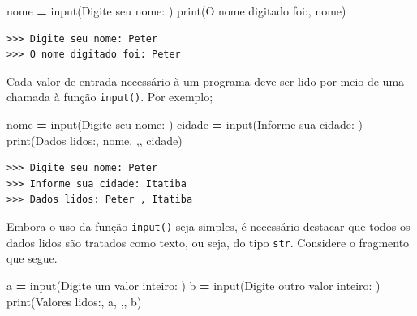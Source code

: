 \documentclass[
]{book}
\newenvironment{Shaded}{\begin{snugshade}}{\end{snugshade}}
\newcommand{\BuiltInTok}[1]{#1}
\newcommand{\NormalTok}[1]{#1}
\newcommand{\OperatorTok}[1]{\textcolor[rgb]{0.81,0.36,0.00}{\textbf{#1}}}
\newcommand{\StringTok}[1]{\textcolor[rgb]{0.31,0.60,0.02}{#1}}
\begin{document}
\begin{Shaded}
\begin{Highlighting}[]
\NormalTok{nome }\OperatorTok{=} \BuiltInTok{input}\NormalTok{(}\StringTok{\textquotesingle{}Digite seu nome: \textquotesingle{}}\NormalTok{)}
\BuiltInTok{print}\NormalTok{(}\StringTok{\textquotesingle{}O nome digitado foi:\textquotesingle{}}\NormalTok{, nome)}
\end{Highlighting}
\end{Shaded}

\begin{verbatim}
>>> Digite seu nome: Peter
>>> O nome digitado foi: Peter
\end{verbatim}

Cada valor de entrada necessário à um programa deve ser lido por meio de uma chamada à função \texttt{input()}. Por exemplo;

\begin{Shaded}
\begin{Highlighting}[]
\NormalTok{nome }\OperatorTok{=} \BuiltInTok{input}\NormalTok{(}\StringTok{\textquotesingle{}Digite seu nome: \textquotesingle{}}\NormalTok{)}
\NormalTok{cidade }\OperatorTok{=} \BuiltInTok{input}\NormalTok{(}\StringTok{\textquotesingle{}Informe sua cidade: \textquotesingle{}}\NormalTok{)}
\BuiltInTok{print}\NormalTok{(}\StringTok{\textquotesingle{}Dados lidos:\textquotesingle{}}\NormalTok{, nome, }\StringTok{\textquotesingle{},\textquotesingle{}}\NormalTok{, cidade)}
\end{Highlighting}
\end{Shaded}

\begin{verbatim}
>>> Digite seu nome: Peter
>>> Informe sua cidade: Itatiba
>>> Dados lidos: Peter , Itatiba
\end{verbatim}

Embora o uso da função \texttt{input()} seja simples, é necessário destacar que todos os dados lidos são tratados como texto, ou seja, do tipo \texttt{str}. Considere o fragmento que segue.

\begin{Shaded}
\begin{Highlighting}[]
\NormalTok{a }\OperatorTok{=} \BuiltInTok{input}\NormalTok{(}\StringTok{\textquotesingle{}Digite um valor inteiro: \textquotesingle{}}\NormalTok{)}
\NormalTok{b }\OperatorTok{=} \BuiltInTok{input}\NormalTok{(}\StringTok{\textquotesingle{}Digite outro valor inteiro: \textquotesingle{}}\NormalTok{)}
\BuiltInTok{print}\NormalTok{(}\StringTok{\textquotesingle{}Valores lidos:\textquotesingle{}}\NormalTok{, a, }\StringTok{\textquotesingle{},\textquotesingle{}}\NormalTok{, b)}
\end{Highlighting}
\end{Shaded}
\end{document}
